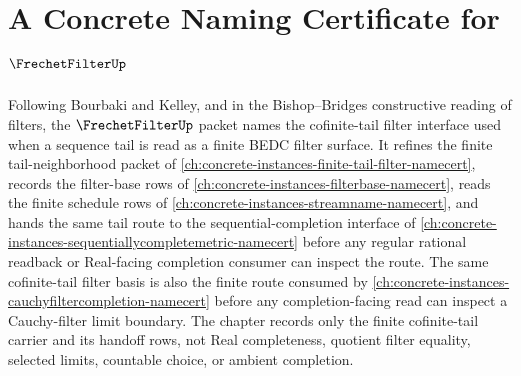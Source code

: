 \chapter{A Concrete Naming Certificate for $\FrechetFilterUp$}
\label{ch:concrete-instances-frechetfilter-namecert}

Following Bourbaki and Kelley, and in the Bishop--Bridges constructive reading of filters, the $\FrechetFilterUp$ packet names the cofinite-tail filter interface used when a sequence tail is read as a finite BEDC filter surface. It refines the finite tail-neighborhood packet of \autoref{ch:concrete-instances-finite-tail-filter-namecert}, records the filter-base rows of \autoref{ch:concrete-instances-filterbase-namecert}, reads the finite schedule rows of \autoref{ch:concrete-instances-streamname-namecert}, and hands the same tail route to the sequential-completion interface of \autoref{ch:concrete-instances-sequentiallycompletemetric-namecert} before any regular rational readback or Real-facing completion consumer can inspect the route. The same cofinite-tail filter basis is also the finite route consumed by \autoref{ch:concrete-instances-cauchyfiltercompletion-namecert} before any completion-facing read can inspect a Cauchy-filter limit boundary. The chapter records only the finite cofinite-tail carrier and its handoff rows, not Real completeness, quotient filter equality, selected limits, countable choice, or ambient completion.

